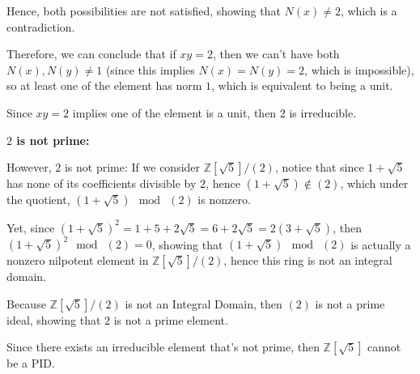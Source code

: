 \documentclass{article}
\begin{document}
Hence, both possibilities are not satisfied, showing that $N(x)\neq 2$, which is a contradiction.

Therefore, we can conclude that if $xy=2$, then we can't have both $N(x),N(y)\neq 1$ (since this implies $N(x)=N(y)=2$, which is impossible),
so at least one of the element has norm $1$, which is equivalent to being a unit.

Since $xy=2$ implies one of the element is a unit, then $2$ is irreducible.

\hfil

\textbf{$2$ is not prime:}

However, $2$ is not prime: If we consider $\mathbb{Z}[\sqrt{5}]/(2)$, notice that since $1+\sqrt{5}$ has none of its coefficients divisible by $2$,
hence $(1+\sqrt{5})\notin (2)$, which under the quotient, $(1+\sqrt{5})\mod\ (2)$ is nonzero.

Yet, since $(1+\sqrt{5})^2 = 1+5+2\sqrt{5} = 6+2\sqrt{5}=2(3+\sqrt{5})$, then $(1+\sqrt{5})^2\mod\ (2)=0$,
showing that $(1+\sqrt{5})\mod\ (2)$ is actually a nonzero nilpotent element in $\mathbb{Z}[\sqrt{5}]/(2)$, hence this ring is not an integral domain.

\hfil

Because $\mathbb{Z}[\sqrt{5}]/(2)$ is not an Integral Domain, then $(2)$ is not a prime ideal, showing that $2$ is not a prime element.

Since there exists an irreducible element that's not prime, then $\mathbb{Z}[\sqrt{5}]$ cannot be a PID.
\end{document}
